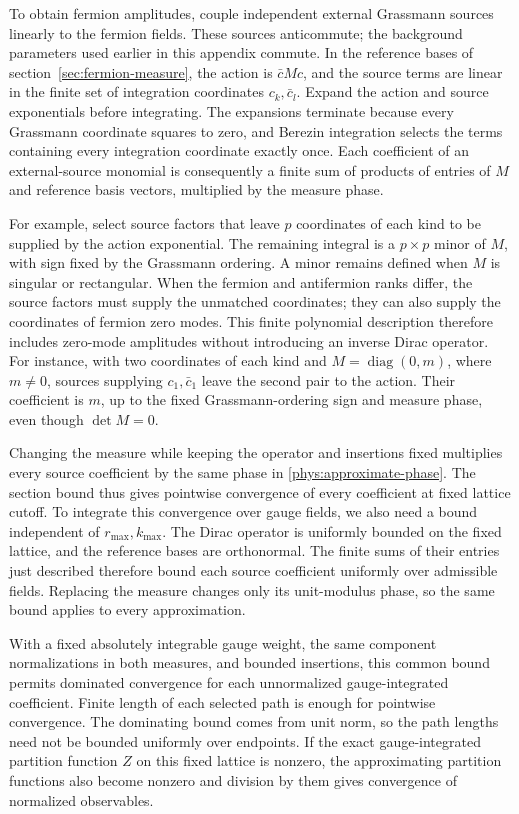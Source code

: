 \documentclass[11pt,a4paper]{article}
\theoremstyle{remark}
\begin{document}
To obtain fermion amplitudes, couple independent external Grassmann
sources linearly to the fermion fields. These sources anticommute;
the background parameters used earlier in this appendix commute.
In the reference bases of section~\ref{sec:fermion-measure}, the
action is $\bar c M c$, and the source terms are linear in the
finite set of integration coordinates $c_k,\bar c_l$. Expand
the action and source exponentials before integrating. The expansions
terminate because every Grassmann coordinate squares to zero, and
Berezin integration selects the terms containing every integration
coordinate exactly once. Each coefficient of an external-source
monomial is consequently a finite sum of products of entries of
$M$ and reference basis vectors, multiplied by the measure phase.

For example, select source factors that leave $p$ coordinates
of each kind to be supplied by the action exponential. The remaining
integral is a $p\times p$ minor of $M$, with sign fixed by
the Grassmann ordering. A minor remains defined when $M$ is
singular or rectangular. When the fermion and antifermion ranks
differ, the source factors must supply the unmatched coordinates;
they can also supply the coordinates of fermion zero modes. This
finite polynomial description therefore includes zero-mode
amplitudes without introducing an inverse Dirac operator. For instance,
with two coordinates of each kind and $M=\operatorname{diag}(0,m)$,
where $m\ne0$, sources supplying $c_1,\bar c_1$ leave the second
pair to the action. Their coefficient is $m$, up to the fixed
Grassmann-ordering sign and measure phase, even though $\det M=0$.

Changing the measure while keeping the operator and insertions fixed
multiplies every source coefficient by the same phase in
\eqref{phys:approximate-phase}. The section bound thus gives
pointwise convergence of every coefficient at fixed lattice cutoff.
To integrate this convergence over gauge fields, we also need a
bound independent of $r_{\max},k_{\max}$. The Dirac operator
is uniformly bounded on the fixed lattice, and the reference bases
are orthonormal. The finite sums of their entries just described
therefore bound each source coefficient uniformly over admissible
fields. Replacing the measure changes only its unit-modulus phase,
so the same bound applies to every approximation.

With a fixed absolutely integrable gauge weight, the same component
normalizations in both measures, and bounded insertions, this common
bound permits dominated convergence for each unnormalized
gauge-integrated coefficient. Finite length of each selected path
is enough for pointwise convergence. The dominating bound comes
from unit norm, so the path lengths need not be bounded uniformly
over endpoints. If the exact gauge-integrated partition function
$Z$ on this fixed lattice is nonzero, the approximating partition
functions also become nonzero and division by them gives convergence
of normalized observables.
\end{document}
